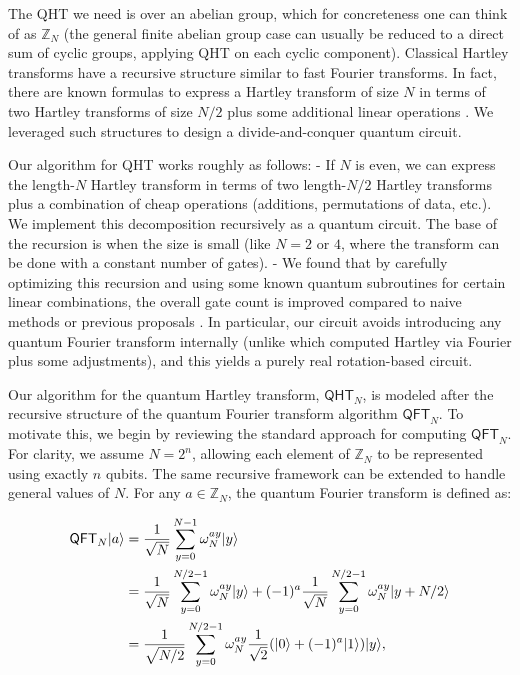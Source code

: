 \documentclass[12pt]{report}
\newcommand{\qht}{\mathsf{QHT}}
\newcommand{\qft}{\mathsf{QFT}}
\begin{document}
The QHT we need is over an abelian group, which for concreteness one can think of as $\mathbb{Z}_N$ (the general finite abelian group case can usually be reduced to a direct sum of cyclic groups, applying QHT on each cyclic component). Classical Hartley transforms have a recursive structure similar to fast Fourier transforms. In fact, there are known formulas to express a Hartley transform of size $N$ in terms of two Hartley transforms of size $N/2$ plus some additional linear operations \cite{Bracewell1984}. We leveraged such structures to design a divide-and-conquer quantum circuit.

Our algorithm for QHT works roughly as follows:
- If $N$ is even, we can express the length-$N$ Hartley transform in terms of two length-$N/2$ Hartley transforms plus a combination of cheap operations (additions, permutations of data, etc.). We implement this decomposition recursively as a quantum circuit. The base of the recursion is when the size is small (like $N=2$ or $4$, where the transform can be done with a constant number of gates).
- We found that by carefully optimizing this recursion and using some known quantum subroutines for certain linear combinations, the overall gate count is improved compared to naive methods or previous proposals \cite{Klappenecker2001DCT,Klappenecker2001Signal}. In particular, our circuit avoids introducing any quantum Fourier transform internally (unlike \cite{Klappenecker2001Signal} which computed Hartley via Fourier plus some adjustments), and this yields a purely real rotation-based circuit.



Our algorithm for the quantum Hartley transform, \( \qht_N \), is modeled after the recursive structure of the quantum Fourier transform algorithm \( \qft_N \). To motivate this, we begin by reviewing the standard approach for computing \( \qft_N \). For clarity, we assume \( N = 2^n \), allowing each element of \( \mathbb{Z}_N \) to be represented using exactly \( n \) qubits. The same recursive framework can be extended to handle general values of \( N \). For any \( a \in \mathbb{Z}_N \), the quantum Fourier transform is defined as:


\begin{align}
    \qft_N\ket{a}
    & = \frac{1}{\sqrt{N}} \sum_{y = 0}^{N - 1} \omega_N^{ay}\ket{y} \\
    & = \frac{1}{\sqrt{N}} \sum_{y = 0}^{N / 2 - 1} \omega_N^{ay} \ket{y} + (-1)^a \frac{1}{\sqrt{N}} \sum_{y = 0}^{N / 2 - 1} \omega_N^{ay} \ket{y + N/2} \\
    & = \frac{1}{\sqrt{N / 2}} \sum_{y = 0}^{N / 2 - 1} \omega_N^{ay} \frac{1}{\sqrt{2}} (\ket{0} + (-1)^a \ket{1}) \ket{y}, \label{eq:qft_alt}
\end{align}
\end{document}

